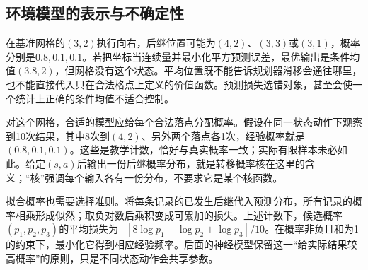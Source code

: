 \subsection{环境模型的表示与不确定性}
\label{sec:rl-learning-model-representation}

在基准网格的$(3,2)$执行向右，后继位置可能为$(4,2)$、$(3,3)$或$(3,1)$，概率分别是$0.8,0.1,0.1$。若把坐标当连续量并最小化平方预测误差，最优输出是条件均值$(3.8,2)$，但网格没有这个状态。平均位置既不能告诉规划器滑移会通往哪里，也不能直接代入只在合法格点上定义的价值函数。预测损失选错对象，甚至会使一个统计上正确的条件均值不适合控制。

对这个网格，合适的模型应给每个合法落点分配概率。假设在同一状态动作下观察到10次结果，其中8次到$(4,2)$、另外两个落点各1次，经验概率就是$(0.8,0.1,0.1)$。这些是教学计数，恰好与真实概率一致；实际有限样本未必如此。给定$(s,a)$后输出一份后继概率分布，就是转移概率核在这里的含义；“核”强调每个输入各有一份分布，不要求它是某个核函数。

拟合概率也需要选择准则。将每条记录的已发生后继代入预测分布，所有记录的概率相乘形成似然；取负对数后乘积变成可累加的损失。上述计数下，候选概率$(p_1,p_2,p_3)$的平均损失为$-[8\log p_1+\log p_2+\log p_3]/10$。在概率非负且和为1的约束下，最小化它得到相应经验频率。后面的神经模型保留这一“给实际结果较高概率”的原则，只是不同状态动作会共享参数。

